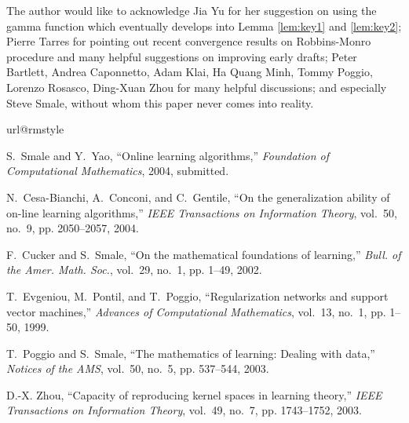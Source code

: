 \documentclass[twoside,twocolumn,journal]{IEEEtran}
\begin{document}
The author would like to acknowledge Jia Yu for her suggestion on using the gamma function which eventually develops into Lemma \ref{lem:key1} and \ref{lem:key2};
Pierre Tarres for pointing out recent convergence results on Robbins-Monro procedure and many helpful suggestions on improving early drafts; Peter Bartlett,
Andrea Caponnetto, Adam Klai, Ha Quang Minh, Tommy Poggio, Lorenzo Rosasco, Ding-Xuan Zhou for many helpful discussions; and especially Steve Smale,
without whom this paper never comes
into reality.





\begin{thebibliography}{10}
\providecommand{\url}[1]{#1}
\csname url@rmstyle\endcsname
\providecommand{\newblock}{\relax}
\providecommand{\bibinfo}[2]{#2}
\providecommand\BIBentrySTDinterwordspacing{\spaceskip=0pt\relax}
\providecommand\BIBentryALTinterwordstretchfactor{4}
\providecommand\BIBentryALTinterwordspacing{\spaceskip=\fontdimen2\font plus
\BIBentryALTinterwordstretchfactor\fontdimen3\font minus
  \fontdimen4\font\relax}
\providecommand\BIBforeignlanguage[2]{{%
\expandafter\ifx\csname l@#1\endcsname\relax
\typeout{** WARNING: IEEEtran.bst: No hyphenation pattern has been}%
\typeout{** loaded for the language `#1'. Using the pattern for}%
\typeout{** the default language instead.}%
\else
\language=\csname l@#1\endcsname
\fi
#2}}

S.~Smale and Y.~Yao, ``Online learning algorithms,'' \emph{Foundation of
  Computational Mathematics}, 2004, submitted.

N.~Cesa-Bianchi, A.~Conconi, and C.~Gentile, ``On the generalization ability of
  on-line learning algorithms,'' \emph{IEEE Transactions on Information
  Theory}, vol.~50, no.~9, pp. 2050--2057, 2004.

F.~Cucker and S.~Smale, ``On the mathematical foundations of learning,''
  \emph{Bull. of the Amer. Math. Soc.}, vol.~29, no.~1, pp. 1--49, 2002.

T.~Evgeniou, M.~Pontil, and T.~Poggio, ``Regularization networks and support
  vector machines,'' \emph{Advances of Computational Mathematics}, vol.~13,
  no.~1, pp. 1--50, 1999.

T.~Poggio and S.~Smale, ``The mathematics of learning: Dealing with data,''
  \emph{Notices of the AMS}, vol.~50, no.~5, pp. 537--544, 2003.

D.-X. Zhou, ``Capacity of reproducing kernel spaces in learning theory,''
  \emph{IEEE Transactions on Information Theory}, vol.~49, no.~7, pp.
  1743--1752, 2003.


\end{thebibliography}
\end{document}
